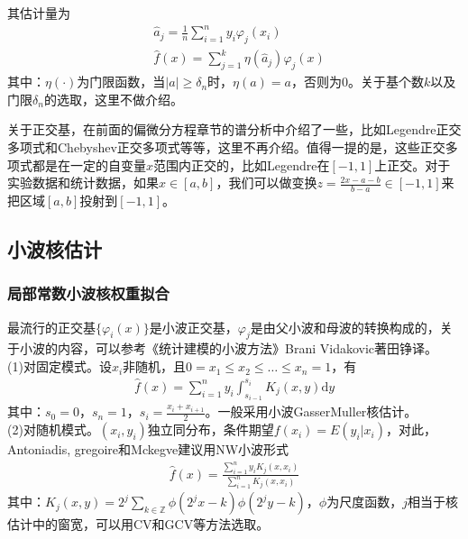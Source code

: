         其估计量为
        \begin{align*}
        &\hat{a}_j = \frac{1}{n} \sum_{i=1}^n y_i\varphi_j(x_i)\\
        &\hat{f}(x) = \sum_{j=1}^k\eta(\hat{a}_j)\varphi_j(x)
        \end{align*}
        其中：$\eta(\cdot)$为门限函数，当$|a| \geqslant \delta_n$时，$\eta(a) = a$，否则为0。关于基个数$k$以及门限$\delta_n$的选取，这里不做介绍。
        \par
        关于正交基，在前面的偏微分方程章节的谱分析中介绍了一些，比如Legendre正交多项式和Chebyshev正交多项式等等，这里不再介绍。值得一提的是，这些正交多项式都是在一定的自变量$x$范围内正交的，比如Legendre在$[-1,1]$上正交。对于实验数据和统计数据，如果$x\in[a,b]$，我们可以做变换$z = \frac{2x - a -b}{b-a} \in [-1,1]$来把区域$[a,b]$投射到$[-1,1]$。

    \subsection{小波核估计}
        \subsubsection{局部常数小波核权重拟合}
            \par
            最流行的正交基$\{\varphi_i(x)\}$是小波正交基，$\varphi_j$是由父小波和母波的转换构成的，关于小波的内容，可以参考《统计建模的小波方法》Brani Vidakovic著田铮译。\\
            (1)对固定模式。设$x_i$非随机，且$0=x_1 \leqslant x_2 \leqslant\dots \leqslant x_n=1$，有
            \begin{align*}
            \hat{f}(x) = \sum_{i=1}^n y_i\int_{s_{i-1}}^{s_i}K_j(x,y)\mathrm{d}y
            \end{align*}
            其中：$s_0 = 0$，$s_n = 1$，$s_i=\frac{x_{i} + x_{i+1}}{2}$。一般采用小波GasserMuller核估计。\\
            (2)对随机模式。$(x_i,y_i)$独立同分布，条件期望$f(x_i) = E(y_i|x_i)$，对此，Antoniadis, gregoire和Mckegve建议用NW小波形式
            \begin{align*}
            \hat{f}(x) = \frac{\sum\limits_{i=1}^ny_iK_j(x,x_i)}{\sum\limits_{i=1}^nK_j(x,x_i)}
            \end{align*}
            其中：$K_j(x,y) = 2^j\sum\limits_{k\in \mathbb{Z}}\phi(2^jx-k)\phi(2^jy-k)$，$\phi$为尺度函数，$j$相当于核估计中的窗宽，可以用CV和GCV等方法选取。


